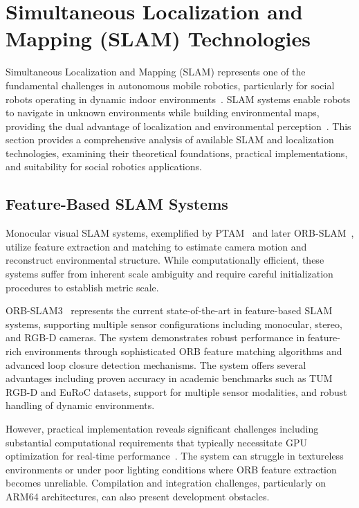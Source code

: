 \section{Simultaneous Localization and Mapping (SLAM) Technologies}
Simultaneous Localization and Mapping (SLAM) represents one of the fundamental challenges in autonomous mobile robotics, particularly for social robots operating in dynamic indoor environments~\cite{durrant2006simultaneous}. SLAM systems enable robots to navigate in unknown environments while building environmental maps, providing the dual advantage of localization and environmental perception~\cite{scaramuzza2011visual}. This section provides a comprehensive analysis of available SLAM and localization technologies, examining their theoretical foundations, practical implementations, and suitability for social robotics applications.

\subsection{Feature-Based SLAM Systems}
Monocular visual SLAM systems, exemplified by PTAM~\cite{klein2007parallel} and later ORB-SLAM~\cite{mur2015orb}, utilize feature extraction and matching to estimate camera motion and reconstruct environmental structure. While computationally efficient, these systems suffer from inherent scale ambiguity and require careful initialization procedures to establish metric scale.

ORB-SLAM3~\cite{campos2021orbslam3} represents the current state-of-the-art in feature-based SLAM systems, supporting multiple sensor configurations including monocular, stereo, and RGB-D cameras. The system demonstrates robust performance in feature-rich environments through sophisticated ORB feature matching algorithms and advanced loop closure detection mechanisms. The system offers several advantages including proven accuracy in academic benchmarks such as TUM RGB-D and EuRoC datasets, support for multiple sensor modalities, and robust handling of dynamic environments.

However, practical implementation reveals significant challenges including substantial computational requirements that typically necessitate GPU optimization for real-time performance~\cite{huang2018sensor}. The system can struggle in textureless environments or under poor lighting conditions where ORB feature extraction becomes unreliable. Compilation and integration challenges, particularly on ARM64 architectures, can also present development obstacles.

